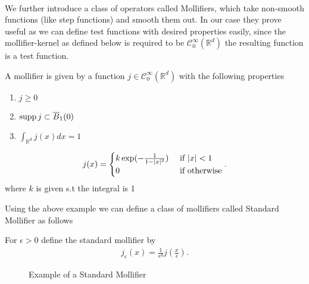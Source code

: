 \hspace{0mm}\\
We further introduce a class of operators called Mollifiers, which take non-smooth functions (like step functions) and smooth them out. 
In our case they prove useful as we can define test functions with desired properties easily, since the mollifier-kernel as defined below
is required to be $\mathcal{C}_0^{\infty}(\mathbb{R}^{d })$ the resulting function is a test function.
\begin{definition}
A mollifier is given by a function $j \in  \mathcal{C}_0^{\infty}(\mathbb{R}^{d } ) $ with the following properties 
\begin{enumerate}
  \item $j \ge 0$  
  \item $\operatorname*{supp} j \subset  \overline{B}_1(0)  $
  \item $\int_{\mathbb{R}^{d} } j(x) dx = 1$
\end{enumerate} 
\end{definition}
\pagebreak
\begin{example}
 \begin{align*}
   j(x) = \begin{cases}
     k \exp(-\frac{1}{1-\lvert x\rvert^2}) &\text{ if } \lvert x\rvert < 1 \\
     0 &\text{ if } \text{otherwise}
   \end{cases} 
 .\end{align*}
 where $k$ is given s.t the integral is 1 
\end{example}
Using the above example we can define a class of mollifiers called Standard Mollifier as follows
\begin{definition}
 For $\epsilon >0$  define the standard mollifier by 
 \begin{align*}
   j_{\epsilon }(x) = \frac{1}{\epsilon^d}j(\frac{x}{\epsilon }) 
 .\end{align*}
\end{definition}
\begin{figure}[H]
   \begin{center}
   \end{center}
   \caption{Example of a Standard Mollifier}
 \end{figure}
